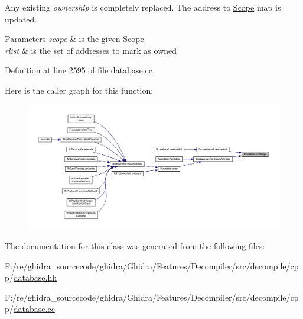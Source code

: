 Any existing {\itshape ownership} is completely replaced. The address to \mbox{\hyperlink{class_scope}{Scope}} map is updated. 
\begin{DoxyParams}{Parameters}
{\em scope} & is the given \mbox{\hyperlink{class_scope}{Scope}} \\
\hline
{\em rlist} & is the set of addresses to mark as owned \\
\hline
\end{DoxyParams}


Definition at line 2595 of file database.\+cc.

Here is the caller graph for this function\+:
\nopagebreak
\begin{figure}[H]
\begin{center}
\leavevmode
\includegraphics[width=350pt]{class_database_ac4397e487146864510d89c9e3d12a2a7_icgraph}
\end{center}
\end{figure}


The documentation for this class was generated from the following files\+:\begin{DoxyCompactItemize}
\item 
F\+:/re/ghidra\+\_\+sourcecode/ghidra/\+Ghidra/\+Features/\+Decompiler/src/decompile/cpp/\mbox{\hyperlink{database_8hh}{database.\+hh}}\item 
F\+:/re/ghidra\+\_\+sourcecode/ghidra/\+Ghidra/\+Features/\+Decompiler/src/decompile/cpp/\mbox{\hyperlink{database_8cc}{database.\+cc}}\end{DoxyCompactItemize}
